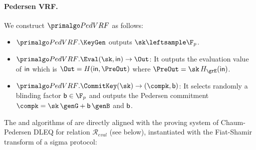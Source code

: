 \paragraph{Pedersen VRF.} 
We construct $\PedVRF$ as follows:

\begin{itemize}
	\item $\PedVRF.\KeyGen$  outputs  $\sk \leftsample \F_p$. %
	\item $\PedVRF.\Eval(\sk,\msg) \rightarrow \Out$: It outputs the evaluation value of $ \mathsf{in} $ which is $ \Out = H(\msg, \PreOut) $  where $\PreOut = \sk \, H_{\grE}(\msg)$.



\item $\PedVRF.\CommitKey(\sk) \rightarrow (\compk, \openpk) $: It selects randomly a blinding factor $ \openpk \in \F_p $ and outputs the Pedersen commitment $ \compk =   \sk \, \genG + \openpk \, \genB$ and $ \mathsf{b} $.  
\end{itemize}

The \Sign and \Verify algorithms of \PedVRF are directly  aligned with the proving system of Chaum-Pedersen DLEQ for relation $\mathcal{R}_{eval}$ (see below),
instantiated with the Fiat-Shamir transform \cite{FiatS86} of a sigma protocol:

